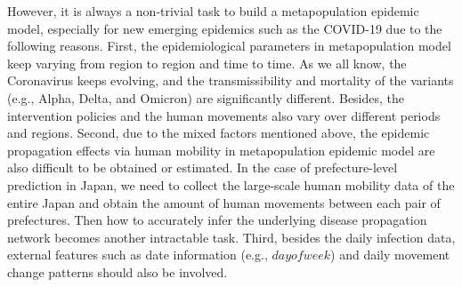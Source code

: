 \documentclass[lettersize,journal]{IEEEtran}
\begin{document}
However, it is always a non-trivial task to build a metapopulation epidemic model, especially for new emerging epidemics such as the COVID-19 due to the following reasons. First, the epidemiological parameters in metapopulation model keep varying from region to region and time to time. As we all know, the Coronavirus keeps evolving, and the transmissibility and mortality of the variants (e.g., Alpha, Delta, and Omicron) are significantly different. Besides, the intervention policies and the human movements also vary over different periods and regions. Second, due to the mixed factors mentioned above, the epidemic propagation effects via human mobility in metapopulation epidemic model are also difficult to be obtained or estimated. In the case of prefecture-level prediction in Japan, we need to collect the large-scale human mobility data of the entire Japan and obtain the amount of human movements between each pair of prefectures. Then how to accurately infer the underlying disease propagation network becomes another intractable task. Third, besides the daily infection data, external features such as date information (e.g., $dayofweek$) and daily movement change patterns should also be involved.
\end{document}
